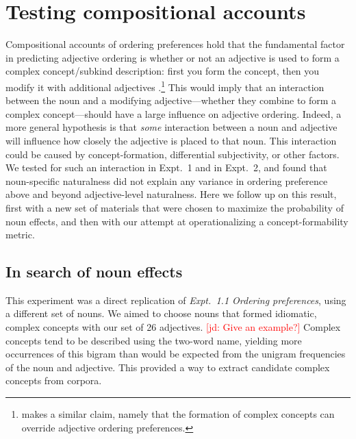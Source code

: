 \documentclass[12pt]{article}
\newcommand{\jd}[1]{\textcolor{red}{[jd: #1]}}
\begin{document}
\section{Testing compositional accounts}

Compositional accounts of ordering preferences hold that the fundamental factor in predicting adjective ordering is whether or not an adjective is used to form a complex concept/subkind description: first you form the concept, then you modify it with additional adjectives \citep{McNally2004,svenonius2008}.\footnote{\cite{bouchard2005} makes a similar claim, namely that the formation of complex concepts can override adjective ordering preferences.} 
This would imply that an interaction between the noun and a modifying adjective---whether they combine to form a complex concept---should have a large influence on adjective ordering. 
Indeed, a more general hypothesis is that \emph{some} interaction between a noun and adjective will influence how closely the adjective is placed to that noun. This interaction could be caused by concept-formation, differential subjectivity, or other factors. We tested for such an interaction in Expt.~1 and in Expt.~2, and found that noun-specific naturalness did not explain any variance in ordering preference above and beyond adjective-level naturalness. %
Here we follow up on this result, first with a new set of materials that were chosen to maximize the probability of noun effects, and then with our attempt at operationalizing a concept-formability metric.

\subsection{In search of noun effects}

This experiment was a direct replication of \emph{Expt.~1.1 Ordering preferences}, using a different set of nouns. We aimed to choose nouns that formed idiomatic, complex concepts with our set of 26 adjectives. \jd{Give an example?} Complex concepts tend to be described using the two-word name, yielding more occurrences of this bigram than would be expected from the unigram frequencies of the noun and adjective. This provided a way to extract candidate complex concepts from corpora.
\end{document}
